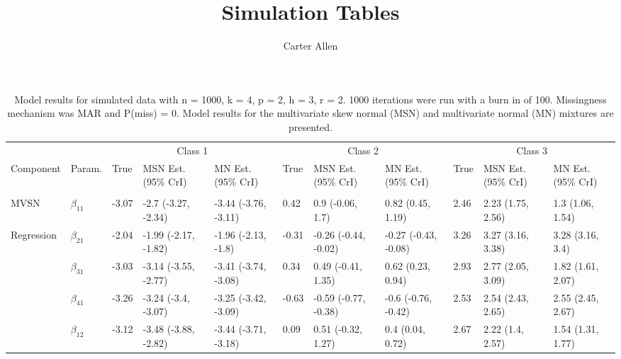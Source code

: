 \documentclass[]{article}
\title{Simulation Tables}
\author{Carter Allen}
\date{}
\begin{document}
\maketitle

\begin{landscape}\begin{table}[t]

\caption{\label{tab:unnamed-chunk-5}Model results for simulated data with n = 1000, k = 4, p = 2, h = 3, r = 2. 1000 iterations were run with a burn in of 100. Missingness mechanism was MAR and P(miss) = 0. Model results for the multivariate skew normal (MSN) and multivariate normal (MN) mixtures are presented.}
\centering
\fontsize{7}{9}\selectfont
\begin{tabular}{lllllllllll}
\toprule
\multicolumn{2}{c}{ } & \multicolumn{3}{c}{Class 1} & \multicolumn{3}{c}{Class 2} & \multicolumn{3}{c}{Class 3} \\
\cmidrule(l{3pt}r{3pt}){3-5} \cmidrule(l{3pt}r{3pt}){6-8} \cmidrule(l{3pt}r{3pt}){9-11}
Component & Param. & True & MSN Est. (95\% CrI) & MN Est. (95\% CrI)  & True & MSN Est. (95\% CrI) & MN Est. (95\% CrI) & True & MSN Est. (95\% CrI) & MN Est. (95\% CrI)\\
\midrule
\addlinespace[0.3em]
\multicolumn{11}{l}{\textbf{ }}\\
\hspace{1em}MVSN & $\beta_{11}$ & -3.07 & -2.7 (-3.27, -2.34) & -3.44 (-3.76, -3.11) & 0.42 & 0.9 (-0.06, 1.7) & 0.82 (0.45, 1.19) & 2.46 & 2.23 (1.75, 2.56) & 1.3 (1.06, 1.54)\\
\hspace{1em}Regression & $\beta_{21}$ & -2.04 & -1.99 (-2.17, -1.82) & -1.96 (-2.13, -1.8) & -0.31 & -0.26 (-0.44, -0.02) & -0.27 (-0.43, -0.08) & 3.26 & 3.27 (3.16, 3.38) & 3.28 (3.16, 3.4)\\
\hspace{1em} & $\beta_{31}$ & -3.03 & -3.14 (-3.55, -2.77) & -3.41 (-3.74, -3.08) & 0.34 & 0.49 (-0.41, 1.35) & 0.62 (0.23, 0.94) & 2.93 & 2.77 (2.05, 3.09) & 1.82 (1.61, 2.07)\\
\hspace{1em} & $\beta_{41}$ & -3.26 & -3.24 (-3.4, -3.07) & -3.25 (-3.42, -3.09) & -0.63 & -0.59 (-0.77, -0.38) & -0.6 (-0.76, -0.42) & 2.53 & 2.54 (2.43, 2.65) & 2.55 (2.45, 2.67)\\
\hspace{1em} & $\beta_{12}$ & -3.12 & -3.48 (-3.88, -2.82) & -3.44 (-3.71, -3.18) & 0.09 & 0.51 (-0.32, 1.27) & 0.4 (0.04, 0.72) & 2.67 & 2.22 (1.4, 2.57) & 1.54 (1.31, 1.77)\\

\end{tabular}
\end{table}
\end{landscape}
\end{document}
